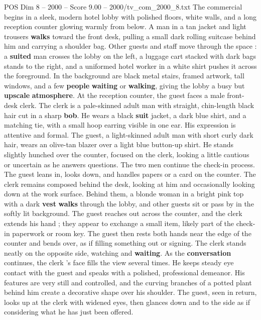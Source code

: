 \begin{textsample}{POS Dim 8 – 2000 – Score 9.00 – 2000/tv\_com\_2000\_8.txt}  \label{ex:f8_pos_008}
The commercial begins in a sleek, modern hotel lobby with polished floors, white walls, and a long reception counter glowing warmly from below.
A man in a tan jacket and light trousers \textbf{walks} toward the front desk, pulling a small dark rolling suitcase behind him and carrying a shoulder bag.
Other guests and staff move through the space : a \textbf{suited} man crosses the lobby on the left, a luggage cart stacked with dark bags stands to the right, and a uniformed hotel worker in a white shirt pushes it across the foreground.
In the background are black metal stairs, framed artwork, tall windows, and a few \textbf{people} \textbf{waiting} or \textbf{walking}, giving the lobby a busy but \textbf{upscale} \textbf{atmosphere}.
At the reception counter, the guest faces a male front-desk clerk.
The clerk is a pale-skinned adult man with straight, chin-length black hair cut in a sharp \textbf{bob}.
He wears a black \textbf{suit} jacket, a dark blue shirt, and a matching tie, with a small hoop earring visible in one ear.
His expression is attentive and formal.
The guest, a light-skinned adult man with short curly dark hair, wears an olive-tan blazer over a light blue button-up shirt.
He stands slightly hunched over the counter, focused on the clerk, looking a little cautious or uncertain as he answers questions.
The two men continue the check-in process.
The guest leans in, looks down, and handles papers or a card on the counter.
The clerk remains composed behind the desk, looking at him and occasionally looking down at the work surface.
Behind them, a blonde woman in a bright pink top with a dark \textbf{vest} \textbf{walks} through the lobby, and other guests sit or pass by in the softly lit background.
The guest reaches out across the counter, and the clerk extends his hand ; they appear to exchange a small item, likely part of the check-in paperwork or room key.
The guest then rests both hands near the edge of the counter and bends over, as if filling something out or signing.
The clerk stands neatly on the opposite side, watching and \textbf{waiting}.
As the \textbf{conversation} continues, the clerk ’s face fills the view several times.
He keeps steady eye contact with the guest and speaks with a polished, professional demeanor.
His features are very still and controlled, and the curving branches of a potted plant behind him create a decorative shape over his shoulder.
The guest, seen in return, looks up at the clerk with widened eyes, then glances down and to the side as if considering what he has just been offered.

\end{textsample}

